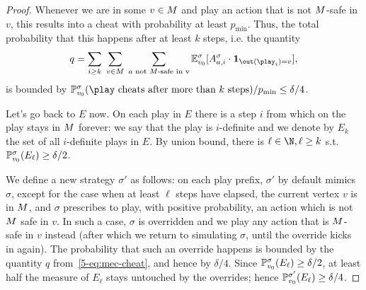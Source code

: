 \begin{proof}
 Whenever we are in some $ v\in M $ and play an action that is not $ M $-safe in $ v $, this results into a cheat with  probability at least $ p_{\min} $. Thus, the total probability that this happens after at least $ k $ steps, i.e. the quantity \begin{equation}\label{5-eq:mec-cheat}q= \sum_{i \geq k}\;\sum_{v\in \mec}\;\sum_{a \text{ not $ \mec $-safe in v}}\expv^\sigma_{\vinit}[ \actevent{\sigma}{a}{i}\cdot\indicator{ \out(\play_i)= v} ] , \end{equation}
 is bounded by $ \probm_{\vinit}^\sigma(\play \text{ cheats after more than $ k $ steps})/p_{\min} \leq \delta/4$.
 
 Let's go back to $ E $ now. On each play in $ E $ there is a step $ i $ from which on the play stays in $ M $ forever: we say that the play is $ i $-definite and we denote by $E_k$ the set of all $ i $-definite plays in $ E $. By union bound, there is $ \ell \in \N, \ell \geq k $ s.t. $ \mathbb{P}_{v_0}^\sigma(E_\ell)  \geq \delta/2$. 
 
 We define a new strategy $ \sigma' $ as follows: on each play prefix, $ \sigma' $ by default mimics $ \sigma $, except for the case when at least $ \ell $ steps have elapsed, the current vertex $ v $ is in $ M $, and $ \sigma $ prescribes to play, with positive probability, an action which is not $ M $ safe in $ v $. In such a case, $ \sigma $ is overridden and we play any action that is $ M $-safe in $ v $ instead (after which we return to simulating $ \sigma $, until the override kicks in again). The probability that such an override happens is bounded by the quantity $ q $ from~\eqref{5-eq:mec-cheat}, and hence by $ \delta/4 $. Since  $ \mathbb{P}_{v_0}^\sigma(E_\ell)  \geq \delta/2$, at least half the measure of $ E_{\ell} $ stays untouched by the overrides; hence  $ \mathbb{P}_{v_0}^{\sigma'}(E_\ell)\geq \delta/4 $.
 

\end{proof}
